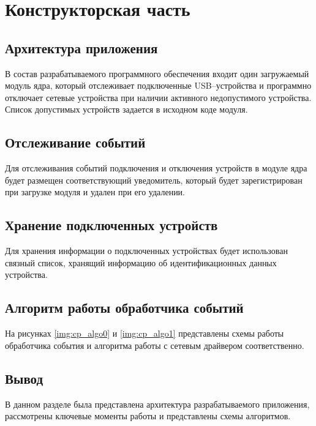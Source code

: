 \chapter{Конструкторская часть}

\section{Архитектура приложения}

В состав разрабатываемого программного обеспечения входит один загружаемый модуль ядра, который отслеживает подключенные USB--устройства и программно отключает сетевые устройства при наличии активного недопустимого устройства. Список допустимых устройств задается в исходном коде модуля.

\section{Отслеживание событий}

Для отслеживания событий подключения и отключения устройств в модуле ядра будет размещен соответствующий уведомитель, который будет зарегистрирован при загрузке модуля и удален при его удалении.

\section{Хранение подключенных устройств}

Для хранения информации о подключенных устройствах будет использован связный список, хранящий информацию об идентификационных данных устройства.

\section{Алгоритм работы обработчика событий}

На рисунках \ref{img:cp_algo0} и \ref{img:cp_algo1} представлены схемы работы обработчика события и алгоритма работы с сетевым драйвером соответственно.



\section*{Вывод}

В данном разделе была представлена архитектура разрабатываемого приложения, рассмотрены ключевые моменты работы и представлены схемы алгоритмов.